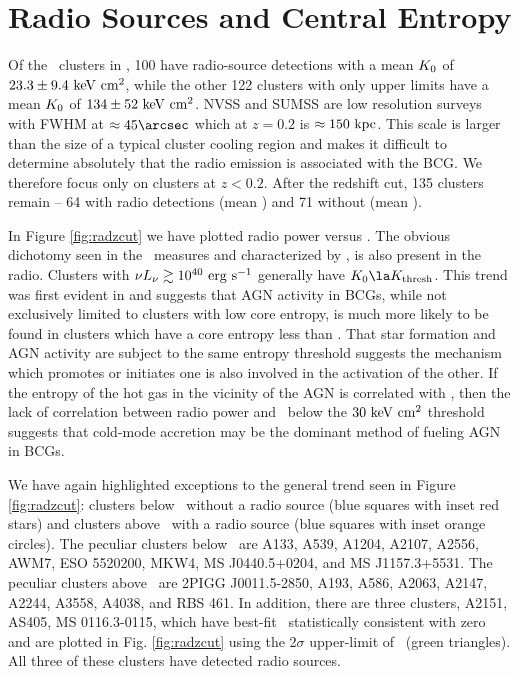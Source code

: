 \documentclass[12pt,preprint]{aastex}
\begin{document}
\section{Radio Sources and Central Entropy}
\label{sec:agn}

Of the \clnum\ clusters in \accept, 100 have radio-source detections
with a mean $K_0$ of $23.3 \pm 9.4 \mathrm{\mbox{\ensuremath{\mathrm{~keV}}} \mathrm{\mbox{\ensuremath{\mathrm{~cm}}}^2}}$, while the other 122
clusters with only upper limits have a mean $K_0$ of $134 \pm 52
\mathrm{\mbox{\ensuremath{\mathrm{~keV}}} \mathrm{\mbox{\ensuremath{\mathrm{~cm}}}^2}}$. NVSS and SUMSS are low resolution surveys with FWHM at $\approx
45\arcsec$ which at $z = 0.2$ is $\approx 150\mbox{\ensuremath{\mathrm{~kpc}}}$. This scale is
larger than the size of a typical cluster cooling region and makes it
difficult to determine absolutely that the radio emission is
associated with the BCG. We therefore focus only on clusters at $z <
0.2$. After the redshift cut, 135 clusters remain -- 64 with radio
detections (mean \frad) and 71 without (mean \nfrad).

In Figure \ref{fig:radzcut} we have plotted radio power versus \kna.
The obvious dichotomy seen in the \halpha\ measures and characterized
by \kthr, is also present in the radio. Clusters with $\nu L_{\nu}
\gtrsim 10^{40} \mathrm{\mbox{\ensuremath{\mathrm{~erg}}} \mathrm{\mbox{\ensuremath{\mathrm{~s}}}^{-1}}}$ generally have $\kna \la \kthr$. This trend
was first evident in \citet{radioquiet} and suggests that AGN activity
in BCGs, while not exclusively limited to clusters with low core
entropy, is much more likely to be found in clusters which have a core
entropy less than \kthr. That star formation and AGN activity are
subject to the same entropy threshold suggests the mechanism which
promotes or initiates one is also involved in the activation of the
other. If the entropy of the hot gas in the vicinity of the AGN is
correlated with \kna, then the lack of correlation between radio power
and \kna\ below the $30 \mathrm{\mbox{\ensuremath{\mathrm{~keV}}} \mathrm{\mbox{\ensuremath{\mathrm{~cm}}}^2}}$ threshold suggests that cold-mode
accretion \citep{pizzolato05, hardcastle07} may be the dominant method
of fueling AGN in BCGs.

We have again highlighted exceptions to the general trend seen in
Figure \ref{fig:radzcut}: clusters below \kthr\ without a radio source
(blue squares with inset red stars) and clusters above \kthr\ with a
radio source (blue squares with inset orange circles). The peculiar
clusters below \kthr\ are A133, A539, A1204, A2107, A2556, AWM7, ESO
5520200, MKW4, MS J0440.5+0204, and MS J1157.3+5531. The peculiar
clusters above \kthr\ are 2PIGG J0011.5-2850, A193, A586, A2063,
A2147, A2244, A3558, A4038, and RBS 461. In addition, there are three
clusters, A2151, AS405, MS 0116.3-0115, which have best-fit
\kna\ statistically consistent with zero and are plotted in
Fig. \ref{fig:radzcut} using the 2$\sigma$ upper-limit of \kna\ (green
triangles). All three of these clusters have detected radio sources.
\end{document}
